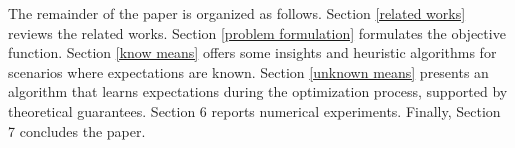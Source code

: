 \documentclass[opre,sglanonrev]{informs4}
\begin{document}
The remainder of the paper is organized as follows. Section \ref{related works} reviews the related works. Section \ref{problem formulation} formulates the objective function. Section \ref{know means} offers some insights and heuristic algorithms for scenarios where expectations are known. Section \ref{unknown means} presents an algorithm that learns expectations during the optimization process, supported by theoretical guarantees. Section 6 reports numerical experiments. Finally, Section 7 concludes the paper.



\end{document}
